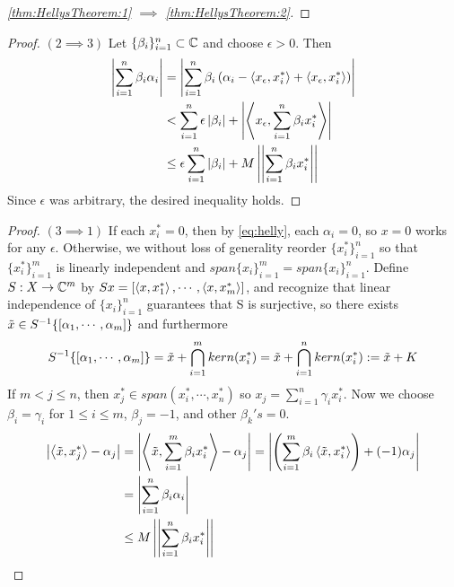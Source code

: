 \begin{thm}
\begin{proof}[\ref{thm:HellysTheorem:1} $\implies$ \ref{thm:HellysTheorem:2}]
    \end{proof}
    \begin{proof} $(2 \implies 3)$
        Let $\{\beta_i\}_{i=1}^n \subset \mathbb{C}$ and choose $\epsilon >0$. 
        Then
        \begin{equation}
            \begin{split}
                \left| \sum_{i=1}^n \beta_i \alpha_i  \right|&= \left|  \sum_{i=1}^n \beta_i \left(  \alpha_i-\left\langle x_\epsilon,x_i^* \right\rangle+\left\langle x_\epsilon,x_i^* \right\rangle\right) \right|\\
                & < \sum_{i=1}^n \epsilon \left| \beta_i \right| + \left|  \left\langle  x_{\epsilon} , \sum_{i=1}^n \beta_ix_i^* \right\rangle \right|\\
                & \leq \epsilon \sum_{i=1}^n \left| \beta_i \right| + M \left|\left| \sum_{i=1}^n \beta_i x_i^* \right|\right|
            \end{split} 
        \end{equation}
        Since $\epsilon$ was arbitrary, the desired inequality holds. 
    \end{proof} 
    \begin{proof} $(3 \implies 1)$
        If each $x_i^*=0$, then by    \ref{eq:helly}, each $\alpha_i=0$, so $x=0$ works for any $\epsilon$. 
        Otherwise, we without loss of generality reorder $\{x_i^*\}_{i=1}^n$ so that $\{x_i^*\}_{i=1}^m$ is linearly independent and $span\{x_i\}_{i=1}^m=span\{x_i\}_{i=1}^n$. 
        Define $S:X \to \mathbb{C}^{m}$ by $Sx=\left[ \left\langle x,x_1^* \right\rangle,\cdots,\left\langle x,x_m^* \right\rangle \right]$, and recognize that linear independence of $\{x_i\}_{i=1}^n$ guarantees that S is surjective, so there exists 
        $\tilde{x} \in S^{-1} \{ \left[ \alpha_1,\cdots,\alpha_m \right]\}$ and furthermore
        \begin{equation}
            S^{-1}\{ \left[ \alpha_1,\cdots,\alpha_m \right]\}=\tilde{x}+ \bigcap_{i=1}^m kern(x_i^*) = \tilde{x}+ \bigcap_{i=1}^n kern(x_i^*):=\tilde{x}+K 
        \end{equation}
        If $m < j \leq n$, then $x_j^* \in span(x_i^*,\cdots,x_n^*)$ so  $x_j = \sum_{i=1}^n \gamma_i x_i^*$.
        Now we choose $\beta_i=\gamma_i$ for $1 \leq i \leq m$, $\beta_j=-1$, and other $\beta_k's=0$. 
        \begin{align} 
            \abs{\ip{\tilde{x},x_j^*}-\alpha_j}&= \abs{\ip{\tilde{x},\sum_{i=1}^m \beta_i x_i^*}-\alpha_j} = \abs{ \pa{\sum_{i=1}^m \beta_i \ip{\tilde{x},x_i^*}}+(-1)\alpha_j}\\
            &=\abs{\sum_{i=1}^n \beta_i \alpha_i} \\
            &\leq M \norm{\sum_{i=1}^n \beta_i x_i^*} \\

\end{align}
\end{proof}
\end{thm}
